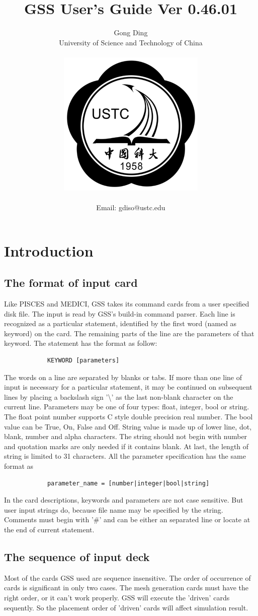 \documentclass[11pt,pdftex]{article}
\title{GSS User's Guide Ver 0.46.01}
\author{Gong Ding
    \\University of Science and Technology of China
    \\\centerline{\includegraphics[scale=0.3]{USTCLogo.png}}
    \\Email: gdiso@ustc.edu
}
\begin{document}
\thispagestyle{empty}
\maketitle
\tableofcontents
\setcounter{tocdepth}{2}%

\section{Introduction}
\subsection{The format of input card}
Like PISCES and MEDICI, GSS takes its command cards from a user
specified disk file. The input is read by GSS's build-in command
parser. Each line is recognized as a particular statement,
identified by the first word (named as keyword) on the card. The
remaining parts of the line are the parameters of that keyword. The
statement has the format as follow:
\begin{verbatim}
            KEYWORD [parameters]
\end{verbatim}
The words on a line are separated by blanks or tabs. If more than
one line of input is necessary for a particular statement, it may be
continued on subsequent lines by placing a backslash sign
'\textbackslash' as the last non-blank character on the current
line. Parameters may be one of four types: float, integer, bool or
string. The float point number supports C style double precision
real number. The bool value can be True, On, False and Off. String
value is made up of lower line, dot, blank, number and alpha
characters. The string should not begin with number and quotation
marks are only needed if it contains blank. At last, the length of
string is limited to 31 characters. All the parameter specification
has the same format as
\begin{verbatim}
            parameter_name = [number|integer|bool|string]
\end{verbatim}


In the card descriptions, keywords and parameters are not case
sensitive. But user input strings do, because file name may be
specified by the string. Comments must begin with '\#' and can be
either an separated line or locate at the end of current statement.

\subsection{The sequence of input deck}
Most of the cards GSS used are sequence insensitive. The order of
occurrence of cards is significant in only two cases. The mesh
generation cards must have the right order, or it can't work
properly. GSS will execute the 'driven' cards sequently. So the
placement order of 'driven' cards will affect simulation result.
\end{document}
